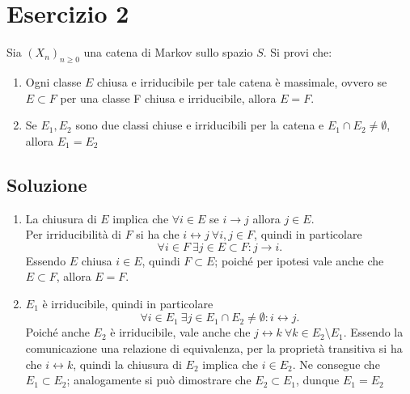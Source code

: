\documentclass[
	12pt, %
]{fphw}
\begin{document}
\section*{Esercizio 2}
\begin{problem}
	\smallskip
	Sia $(X_n)_{n \ge 0}$ una catena di Markov sullo spazio $S$. Si provi che:\\
	\begin{enumerate}
		\item Ogni classe $E$ chiusa e irriducibile per tale catena è massimale, 
		ovvero se $E \subset F$ per una classe F chiusa e irriducibile, allora $E = F$.
		\item Se $E_1, E_2$ sono due classi chiuse e irriducibili per la catena e
		$E_1 \cap E_2 \ne \emptyset$, allora $E_1 = E_2$
	\end{enumerate}
	\smallskip
\end{problem}
\medskip
\subsection*{Soluzione}
	\begin{enumerate}
		\item La chiusura di $E$ implica che $\forall i \in E$ se $i \to j$ allora $j \in E$.\\
		Per irriducibilità di $F$ si ha che $i \leftrightarrow j ~ \forall i,j \in F$, quindi in particolare
		\begin{equation*}
			\forall i \in F ~ \exists j \in E \subset F : j \to i.
		\end{equation*}
		Essendo $E$ chiusa $i \in E$, quindi $F \subset E$;
		poiché per ipotesi vale anche che $E \subset F$, allora $E = F$.
		\item $E_1$ è irriducibile, quindi in particolare
		\begin{equation*}
			\forall i \in E_1 ~ \exists j \in E_1 \cap E_2 \ne \emptyset : i \leftrightarrow j.
		\end{equation*}
		Poiché anche $E_2$ è irriducibile, vale anche che $j \leftrightarrow k ~ \forall k \in E_2 \setminus E_1$.
		Essendo la comunicazione una relazione di equivalenza, per la proprietà transitiva si ha che $i \leftrightarrow k$, quindi la chiusura di $E_2$ implica che $i \in E_2$.
		Ne consegue che $E_1 \subset E_2$; analogamente si può dimostrare che $E_2 \subset E_1$, dunque $E_1 = E_2$
	\end{enumerate}

\end{document}
